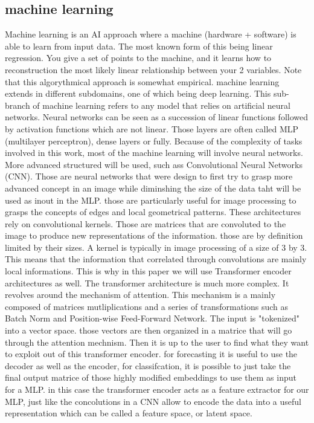 \documentclass{article}
\begin{document}
\subsection{machine learning}
Machine learning is an AI approach where a machine (hardware + software) is able to learn from input data. The most known form of this being linear regression. You give a set of points to the machine, and it learns how to reconstruction the most likely linear relationship between your 2 variables. Note that this algorythmical approach is somewhat empirical. machine learning extends in different subdomains, one of which being deep learning. This sub-branch of machine learning refers to any model that relies on artificial neural networks. Neural networks can be seen as a succession of linear functions followed by activation functions which are not linear. Those layers are often called MLP (multilayer perceptron), dense layers or fully. Because of the complexity of tasks involved in this work, most of the machine learning will involve neural networks. More advanced structured will be used, such ass Convolutional Neural Networks (CNN). Those are neural networks that were design to first try to grasp more advanced concept in an image while diminshing the size of the data taht will be used as inout in the MLP. those are particularly useful for image processing to grasps the concepts of edges and local geometrical patterns. These architectures rely on convolutional kernels. Those are matrices that are convoluted to the image to produce new representations of the information. those are by definition limited by their sizes. A kernel is typically in image processing of a size of 3 by 3. This means that the information that correlated through convolutions are mainly local informations. This is why in this paper we will use Transformer encoder architectures as well. The transformer architecture is much more complex. It revolves around the mechanism of attention. This mechanism is a mainly composed of matrices mutliplications and a series of transformations such as Batch Norm and Position-wise Feed-Forward Network. The input is "tokenized" into a vector space. those vectors are then organized in a matrice that will go through the attention mechnism. Then it is up to the user to find what they want to exploit out of this transformer encoder. for forecasting it is useful to use the decoder as well as the encoder, for classifcation, it is possible to just take the final output matrice of those highly modified embeddings to use them as input for a MLP. in this case the transformer encoder acts as a feature extractor for our MLP, just like the concolutions in a CNN allow to encode the data into a useful representation which can be called a feature space, or latent space.
\end{document}
